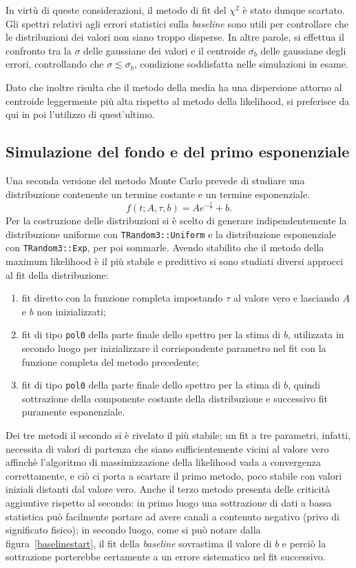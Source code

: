 \documentclass[10pt, oneside, a4paper]{article}   	%
\begin{document}
In virtù di queste considerazioni, il metodo di fit del $\chi^2$ è stato dunque scartato. 
Gli spettri relativi agli errori statistici sulla \textit{baseline} sono utili per controllare che le distribuzioni dei valori non siano troppo disperse. In altre parole, si effettua il confronto tra la $\sigma$ delle gaussiane dei valori e il centroide $\overline{\sigma_{b}}$ delle gaussiane degli errori, controllando che $\sigma\lesssim \overline{\sigma_{b}}$, condizione soddisfatta nelle simulazioni in esame. 

Dato che inoltre risulta che il metodo della media ha una dispersione attorno al centroide leggermente più alta rispetto al metodo della likelihood, si preferisce da qui in poi l'utilizzo di quest'ultimo.

%
\subsection{Simulazione del fondo e del primo esponenziale} \label{bexp}
Una seconda versione del metodo Monte Carlo prevede di studiare una distribuzione contenente un termine costante e un termine esponenziale. 
\begin{equation}
 f(t;A,\tau,b)=Ae^{-\frac{t}{\tau}}+b .
 \label{eq::exp_plus_base}
\end{equation}
Per la costruzione delle distribuzioni si è scelto di generare indipendentemente la distribuzione uniforme con \lstinline{TRandom3::Uniform} e la distribuzione esponenziale con \lstinline{TRandom3::Exp}, per poi sommarle. Avendo stabilito che il metodo della maximum likelihood è il più stabile e predittivo si sono studiati diversi approcci al fit della distribuzione:
\begin{enumerate}
  \item fit diretto con la funzione completa impostando $\tau$ al valore vero e lasciando $A$ e $b$ non inizializzati;
  \item fit di tipo \lstinline{pol0} della parte finale dello spettro per la stima di $b$, utilizzata in secondo luogo per inizializzare il corrispondente parametro nel fit con la funzione completa del metodo precedente;
  \item fit di tipo \lstinline{pol0} della parte finale dello spettro per la stima di $b$, quindi sottrazione della componente costante della distribuzione e successivo fit puramente esponenziale.
\end{enumerate}
Dei tre metodi il secondo si è rivelato il più stabile; un fit a tre parametri, infatti, necessita di valori di partenza che siano sufficientemente vicini al valore vero affinchè l'algoritmo di massimizzazione della likelihood vada a convergenza correttamente, e ciò ci porta a scartare il primo metodo, poco stabile con valori iniziali distanti dal valore vero. Anche il terzo metodo presenta delle criticità aggiuntive rispetto al secondo: in primo luogo una sottrazione di dati a bassa statistica può facilmente portare ad avere canali a contenuto negativo (privo di significato fisico); in secondo luogo, come si può notare dalla figura~\ref{baselinestart}, il fit della \textit{baseline} sovrastima il valore di $b$ e perciò la sottrazione porterebbe certamente a un errore sistematico nel fit successivo.
\end{document}
